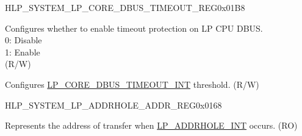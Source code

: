 \begin{register}{H}{LP\_SYSTEM\_LP\_CORE\_DBUS\_TIMEOUT\_REG}{0x01B8}\label{regdesc:LPSYSTEMLPCOREDBUSTIMEOUTREG}
%
%
%
\regnewline%
\begin{regdesc}\begin{reglist}
\label{fielddesc:LPSYSTEMLPCOREDBUSTIMEOUTEN}\item [LP\_SYSTEM\_LP\_CORE\_DBUS\_TIMEOUT\_EN] Configures whether to enable timeout protection on LP CPU DBUS. \\
0: Disable\\
1: Enable\\
(R/W)
\label{fielddesc:LPSYSTEMLPCOREDBUSTIMEOUTTHRES}\item [LP\_SYSTEM\_LP\_CORE\_DBUS\_TIMEOUT\_THRES] Configures \hyperref[tab:sysreg-int-sources]{LP\_CORE\_DBUS\_TIMEOUT\_INT} threshold. (R/W)
\end{reglist}\end{regdesc}
\end{register}


\begin{register}{H}{LP\_SYSTEM\_LP\_ADDRHOLE\_ADDR\_REG}{0x0168}\label{regdesc:LPSYSTEMLPADDRHOLEADDRREG}
%
\regnewline%
\begin{regdesc}\begin{reglist}
\label{fielddesc:LPSYSTEMLPADDRHOLEADDR}\item [LP\_SYSTEM\_LP\_ADDRHOLE\_ADDR] Represents the address of transfer when \hyperref[tab:sysreg-int-sources]{LP\_ADDRHOLE\_INT} occurs. (RO)
\end{reglist}\end{regdesc}
\end{register}


